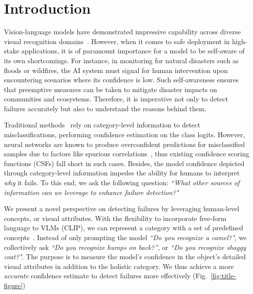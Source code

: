 \section{Introduction}
Vision-language models have demonstrated impressive capability across diverse visual recognition domains~\cite{Radford2021LearningTV,Jia2021ScalingUV,Singh2021FLAVAAF,Li2022BLIPBL, Li2023BLIP2BL}.
However, when it comes to safe deployment in high-stake applications, it is of paramount importance for a model to be self-aware of its own shortcomings.
For instance, in monitoring for natural disasters such as floods or wildfires, the AI system must signal for human intervention upon encountering scenarios where its confidence is low. 
Such self-awareness ensures that preemptive measures can be taken to mitigate disaster impacts on communities and ecosystems.
Therefore, it is imperative not only to detect failures accurately but also to understand the reasons behind them.

Traditional methods~\cite{Hendrycks2016ABF, Granese2021DOCTORAS, Zhu2023OpenMixEO, Zhu2023RethinkingCC, liang2020enhancing} rely on category-level information to detect misclassifications, performing confidence estimation on the class logits.
However, neural networks are known to produce overconfident predictions for misclassified samples due to factors like spurious correlations~\cite{Arjovsky2019InvariantRM, Sagawa2019DistributionallyRN}, thus existing confidence scoring functions (CSFs) fall short in such cases.
Besides, the model confidence depicted through category-level information impedes the ability for humans to interpret \textit{why} it fails. %
To this end, we ask the following question: \textit{``What other sources of information can we leverage to enhance failure detection?"}


We present a novel perspective on detecting failures by leveraging human-level concepts, or visual attributes.
With the flexibility to incorporate free-form language to VLMs (\ie CLIP), we can represent a category with a set of predefined concepts~\cite{Menon2022VisualCV, Oikarinen2023LabelFreeCB,li2024beyond,li2024deal}.
Instead of only prompting the model \textit{``Do you recognize a camel?"}, we collectively ask \textit{``Do you recognize humps on back?''}, or \textit{``Do you recognize shaggy coat?"}.
The purpose is to measure the model's confidence in the object's detailed visual attributes in addition to the holistic category.
We thus achieve a more \textit{accurate} confidence estimate to detect failures more effectively (Fig.~\ref{fig:title-figure})

